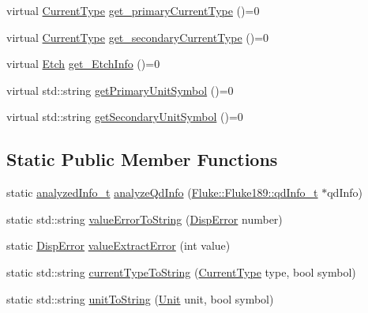 \begin{DoxyCompactItemize}
\item 
virtual \hyperlink{classFluke_1_1Fluke189DataResponseAnalyzerWrapper_afef24496da239e3613c40ad3582d7adc}{CurrentType} \hyperlink{classFluke_1_1Fluke189DataResponseAnalyzerWrapper_afb7361d6963bb0edd9194ba72a1583df}{get\_\-primaryCurrentType} ()=0
\item 
virtual \hyperlink{classFluke_1_1Fluke189DataResponseAnalyzerWrapper_afef24496da239e3613c40ad3582d7adc}{CurrentType} \hyperlink{classFluke_1_1Fluke189DataResponseAnalyzerWrapper_a21a39a54587e31af04c931b46aa11806}{get\_\-secondaryCurrentType} ()=0
\item 
virtual \hyperlink{classFluke_1_1Fluke189DataResponseAnalyzerWrapper_ada71f6ab32a7b0eb40bb0ed96d7053bc}{Etch} \hyperlink{classFluke_1_1Fluke189DataResponseAnalyzerWrapper_a258e56c1ff27b8aae648940599d3b475}{get\_\-EtchInfo} ()=0
\item 
virtual std::string \hyperlink{classFluke_1_1Fluke189DataResponseAnalyzerWrapper_ab7559dd16cb4c1bda20ac54b4f93865b}{getPrimaryUnitSymbol} ()=0
\item 
virtual std::string \hyperlink{classFluke_1_1Fluke189DataResponseAnalyzerWrapper_ab64cf61c2461f5150b0a0ad31ba689cc}{getSecondaryUnitSymbol} ()=0
\end{DoxyCompactItemize}
\subsection*{Static Public Member Functions}
\begin{DoxyCompactItemize}
\item 
static \hyperlink{structFluke_1_1Fluke189DataResponseAnalyzerWrapper_1_1analyzedInfo__t}{analyzedInfo\_\-t} \hyperlink{classFluke_1_1Fluke189DataResponseAnalyzerWrapper_a2bec1dad601bc993375d358ef77c7e6b}{analyzeQdInfo} (\hyperlink{structFluke_1_1Fluke189_1_1qdInfo__t}{Fluke::Fluke189::qdInfo\_\-t} $\ast$qdInfo)
\item 
static std::string \hyperlink{classFluke_1_1Fluke189DataResponseAnalyzerWrapper_aa12dd607815d6ee1530a54855a4b3264}{valueErrorToString} (\hyperlink{classFluke_1_1Fluke189DataResponseAnalyzerWrapper_a5e26140c615bf0b73788f665a7bec9c7}{DispError} number)
\item 
static \hyperlink{classFluke_1_1Fluke189DataResponseAnalyzerWrapper_a5e26140c615bf0b73788f665a7bec9c7}{DispError} \hyperlink{classFluke_1_1Fluke189DataResponseAnalyzerWrapper_ab12ae68ca8c80dce4a952811825de465}{valueExtractError} (int value)
\item 
static std::string \hyperlink{classFluke_1_1Fluke189DataResponseAnalyzerWrapper_a17475d8977da4140a5e7fbe28e3fdb6e}{currentTypeToString} (\hyperlink{classFluke_1_1Fluke189DataResponseAnalyzerWrapper_afef24496da239e3613c40ad3582d7adc}{CurrentType} type, bool symbol)
\item 
static std::string \hyperlink{classFluke_1_1Fluke189DataResponseAnalyzerWrapper_a377922abe231b285470386cd90dec3c0}{unitToString} (\hyperlink{classFluke_1_1Fluke189DataResponseAnalyzerWrapper_ab8e5f2306e4d2ad3d741d273793aaed1}{Unit} unit, bool symbol)
\end{DoxyCompactItemize}

